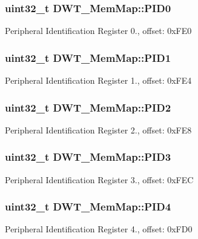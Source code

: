\subsubsection[{P\+I\+D0}]{\setlength{\rightskip}{0pt plus 5cm}uint32\+\_\+t D\+W\+T\+\_\+\+Mem\+Map\+::\+P\+I\+D0}\label{struct_d_w_t___mem_map_a822de5f73ae889eaedbe7ae65428b786}
Peripheral Identification Register 0., offset\+: 0x\+F\+E0 \hypertarget{struct_d_w_t___mem_map_a3f93dbcfbf07c35986c4d989c0bde40e}{}
\subsubsection[{P\+I\+D1}]{\setlength{\rightskip}{0pt plus 5cm}uint32\+\_\+t D\+W\+T\+\_\+\+Mem\+Map\+::\+P\+I\+D1}\label{struct_d_w_t___mem_map_a3f93dbcfbf07c35986c4d989c0bde40e}
Peripheral Identification Register 1., offset\+: 0x\+F\+E4 \hypertarget{struct_d_w_t___mem_map_a3feefc504238282fa83875bb6c754fd0}{}
\subsubsection[{P\+I\+D2}]{\setlength{\rightskip}{0pt plus 5cm}uint32\+\_\+t D\+W\+T\+\_\+\+Mem\+Map\+::\+P\+I\+D2}\label{struct_d_w_t___mem_map_a3feefc504238282fa83875bb6c754fd0}
Peripheral Identification Register 2., offset\+: 0x\+F\+E8 \hypertarget{struct_d_w_t___mem_map_a121e1947f3f7b40e9dd704fe35cd39d2}{}
\subsubsection[{P\+I\+D3}]{\setlength{\rightskip}{0pt plus 5cm}uint32\+\_\+t D\+W\+T\+\_\+\+Mem\+Map\+::\+P\+I\+D3}\label{struct_d_w_t___mem_map_a121e1947f3f7b40e9dd704fe35cd39d2}
Peripheral Identification Register 3., offset\+: 0x\+F\+E\+C \hypertarget{struct_d_w_t___mem_map_a6479f3227be2bba4bd2784301f522723}{}
\subsubsection[{P\+I\+D4}]{\setlength{\rightskip}{0pt plus 5cm}uint32\+\_\+t D\+W\+T\+\_\+\+Mem\+Map\+::\+P\+I\+D4}\label{struct_d_w_t___mem_map_a6479f3227be2bba4bd2784301f522723}
Peripheral Identification Register 4., offset\+: 0x\+F\+D0 \hypertarget{struct_d_w_t___mem_map_a8b21a1c5290151d5474deb51c391b85b}{}
